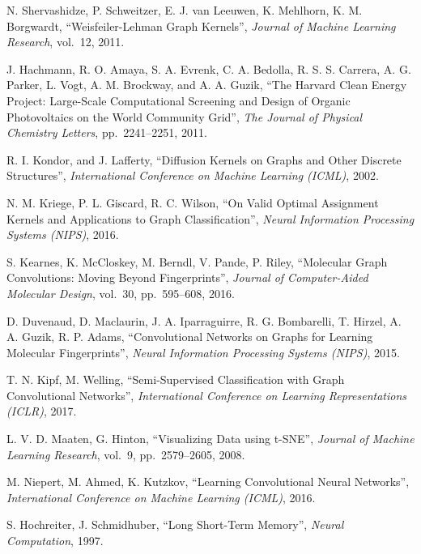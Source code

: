 \documentclass[a4paper]{article}
\begin{document}
\begin{thebibliography}{9}

   N. Shervashidze, P. Schweitzer, E. J. van Leeuwen, K. Mehlhorn, K. M. Borgwardt,
   ``Weisfeiler-Lehman Graph Kernels'',
   \textit{Journal of Machine Learning Research}, vol.~12, 2011.
   
   J. Hachmann, R. O. Amaya, S. A. Evrenk, C. A. Bedolla, R. S. S. Carrera, A. G. Parker, L. Vogt, A. M. Brockway, and A. A. Guzik,
   ``The Harvard Clean Energy Project: Large-Scale Computational Screening and Design of Organic Photovoltaics on the World Community Grid'',
   \textit{The Journal of Physical Chemistry Letters}, pp.~2241--2251, 2011.

   R. I. Kondor, and J. Lafferty,
   ``Diffusion Kernels on Graphs and Other Discrete Structures'',
   \textit{International Conference on Machine Learning (ICML)}, 2002.
   
   N. M. Kriege, P. L. Giscard, R. C. Wilson,
   ``On Valid Optimal Assignment Kernels and Applications to Graph Classification'',
   \textit{Neural Information Processing Systems (NIPS)}, 2016.

   S. Kearnes, K. McCloskey, M. Berndl, V. Pande, P. Riley,
   ``Molecular Graph Convolutions: Moving Beyond Fingerprints'',
   \textit{Journal of Computer-Aided Molecular Design}, vol.~30, pp.~595--608, 2016.

   D. Duvenaud, D. Maclaurin, J. A. Iparraguirre, R. G. Bombarelli, T. Hirzel, A. A. Guzik, R. P. Adams,
   ``Convolutional Networks on Graphs for Learning Molecular Fingerprints'',
   \textit{Neural Information Processing Systems (NIPS)}, 2015.
   
   T. N. Kipf, M. Welling,
   ``Semi-Supervised Classification with Graph Convolutional Networks'',
   \textit{International Conference on Learning Representations (ICLR)}, 2017.

   L. V. D. Maaten, G. Hinton,
   ``Visualizing Data using t-SNE'',
   \textit{Journal of Machine Learning Research}, vol.~9, pp.~2579--2605, 2008.
   
   M. Niepert, M. Ahmed, K. Kutzkov,
   ``Learning Convolutional Neural Networks'',
   \textit{International Conference on Machine Learning (ICML)}, 2016.
   
   S. Hochreiter, J. Schmidhuber,
   ``Long Short-Term Memory'',
   \textit{Neural Computation}, 1997.


\end{thebibliography}
\end{document}
